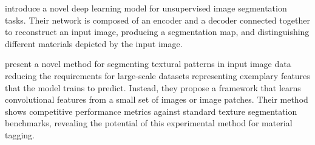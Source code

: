 \cite{xia2017w} introduce a novel deep learning model for unsupervised image segmentation tasks. Their network is composed of an encoder and a decoder connected together to reconstruct an input image, producing a segmentation map, and distinguishing different materials depicted by the input image. 

\cite{kiechle2018model} present a novel method for segmenting textural patterns in input image data reducing the requirements for large-scale datasets representing exemplary features that the model trains to predict. Instead, they propose a framework that learns convolutional features from a small set of images or image patches. Their method shows competitive performance metrics against standard texture segmentation benchmarks, revealing the potential of this experimental method for material tagging. 


